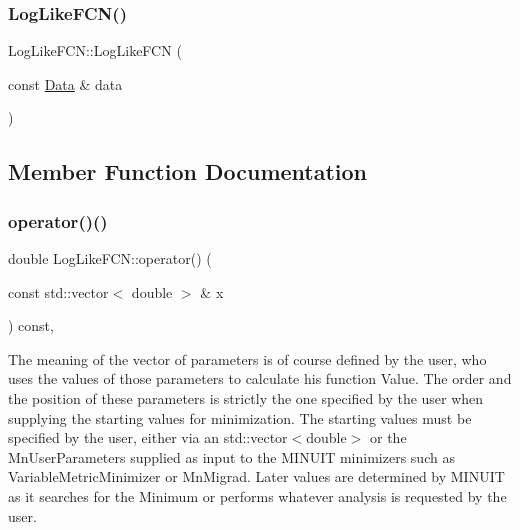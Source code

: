 \mbox{\label{structLogLikeFCN_a45401253d941b65211285bef93b74c59}} 
\subsubsection{\texorpdfstring{LogLikeFCN()}{LogLikeFCN()}\hspace{0.1cm}{\footnotesize\ttfamily [2/2]}}
{\footnotesize\ttfamily Log\+Like\+F\+C\+N\+::\+Log\+Like\+F\+CN (\begin{DoxyParamCaption}\item[{const \mbox{\hyperlink{adat-devel_2other__libs_2minuit_2test_2MnSim_2ParallelTest_8cxx_a1766b42441c3f4d78bb2b56263a8e058}{Data}} \&}]{data }\end{DoxyParamCaption})\hspace{0.3cm}{\ttfamily [inline]}}



\subsection{Member Function Documentation}
\mbox{\label{structLogLikeFCN_a22d42d405147ecea23ab7b3a61003179}} 
\subsubsection{\texorpdfstring{operator()()}{operator()()}\hspace{0.1cm}{\footnotesize\ttfamily [1/2]}}
{\footnotesize\ttfamily double Log\+Like\+F\+C\+N\+::operator() (\begin{DoxyParamCaption}\item[{const std\+::vector$<$ double $>$ \&}]{x }\end{DoxyParamCaption}) const\hspace{0.3cm}{\ttfamily [inline]}, {\ttfamily [virtual]}}

The meaning of the vector of parameters is of course defined by the user, who uses the values of those parameters to calculate his function Value. The order and the position of these parameters is strictly the one specified by the user when supplying the starting values for minimization. The starting values must be specified by the user, either via an std\+::vector$<$double$>$ or the Mn\+User\+Parameters supplied as input to the M\+I\+N\+U\+IT minimizers such as Variable\+Metric\+Minimizer or Mn\+Migrad. Later values are determined by M\+I\+N\+U\+IT as it searches for the Minimum or performs whatever analysis is requested by the user.


